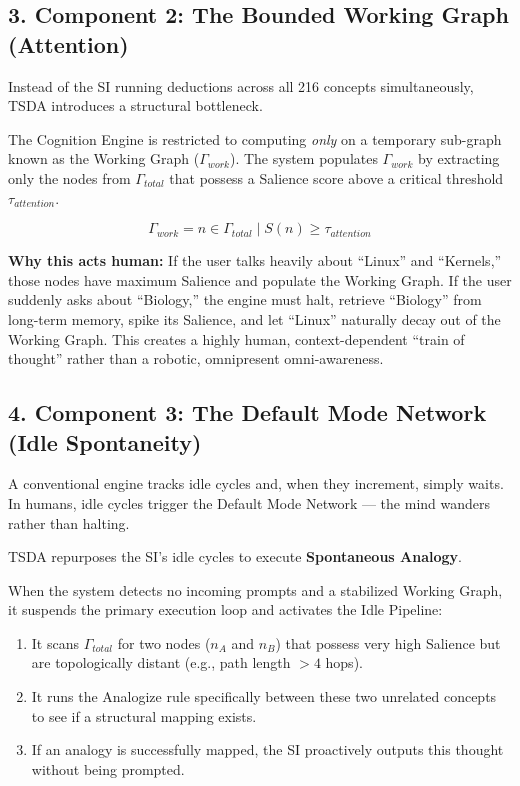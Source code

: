 \documentclass[
  11pt,
  a4paper,
]{article}
\providecommand{\tightlist}{%
  \setlength{\itemsep}{0pt}\setlength{\parskip}{0pt}}
\begin{document}
\subsection{3. Component 2: The Bounded Working Graph
(Attention)}\label{component-2-the-bounded-working-graph-attention}

Instead of the SI running deductions across all 216 concepts
simultaneously, TSDA introduces a structural bottleneck.

The Cognition Engine is restricted to computing \emph{only} on a
temporary sub-graph known as the Working Graph (\(\Gamma_{work}\)). The
system populates \(\Gamma_{work}\) by extracting only the nodes from
\(\Gamma_{total}\) that possess a Salience score above a critical
threshold \(\tau_{attention}\).

\[ \Gamma_{work} = { n \in \Gamma_{total} \mid S(n) \ge \tau_{attention} } \]

\textbf{Why this acts human:} If the user talks heavily about ``Linux''
and ``Kernels,'' those nodes have maximum Salience and populate the
Working Graph. If the user suddenly asks about ``Biology,'' the engine
must halt, retrieve ``Biology'' from long-term memory, spike its
Salience, and let ``Linux'' naturally decay out of the Working Graph.
This creates a highly human, context-dependent ``train of thought''
rather than a robotic, omnipresent omni-awareness.

\subsection{4. Component 3: The Default Mode Network (Idle
Spontaneity)}\label{component-3-the-default-mode-network-idle-spontaneity}

A conventional engine tracks idle cycles and, when they increment,
simply waits. In humans, idle cycles trigger the Default Mode Network
--- the mind wanders rather than halting.

TSDA repurposes the SI's idle cycles to execute \textbf{Spontaneous
Analogy}.

When the system detects no incoming prompts and a stabilized Working
Graph, it suspends the primary execution loop and activates the Idle
Pipeline:

\begin{enumerate}
\def\labelenumi{\arabic{enumi}.}
\tightlist
\item
  It scans \(\Gamma_{total}\) for two nodes (\(n_A\) and \(n_B\)) that
  possess very high Salience but are topologically distant (e.g., path
  length \(> 4\) hops).
\item
  It runs the Analogize rule specifically between these two unrelated
  concepts to see if a structural mapping exists.
\item
  If an analogy is successfully mapped, the SI proactively outputs this
  thought without being prompted.
\end{enumerate}
\end{document}
